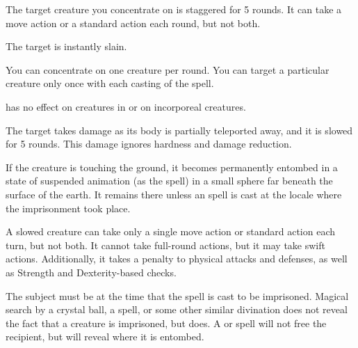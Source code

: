 \begin{spellhealthy}
    The target creature you concentrate on is staggered for 5 rounds. It can take a move action or a standard action each round, but not both.
\end{spellhealthy}
\begin{spellblood}
    The target is instantly slain.
\end{spellblood}
\begin{spellnotes}
    You can concentrate on one creature per round. You can target a particular creature only once with each casting of the spell.
    \par {} has no effect on creatures in  or on incorporeal creatures.
\end{spellnotes}

\begin{spelleffect}
    The target takes damage as its body is partially teleported away, and it is slowed for 5 rounds. This damage ignores hardness and damage reduction.
\end{spelleffect}
\begin{spellblood}
    If the creature is touching the ground, it becomes permanently entombed in a state of suspended animation (as the  spell) in a small sphere far beneath the surface of the earth. It remains there unless an  spell is cast at the locale where the imprisonment took place.
\end{spellblood}
\begin{spellnotes}
    A slowed creature can take only a single move action or standard action each turn, but not both. It cannot take full-round actions, but it may take swift actions. Additionally, it takes a  penalty to physical attacks and defenses, as well as Strength and Dexterity-based checks.

    The subject must be \bloodied at the time that the spell is cast to be imprisoned. Magical search by a crystal ball, a  spell, or some other similar divination does not reveal the fact that a creature is imprisoned, but  does. A  or  spell will not free the recipient, but will reveal where it is entombed.
\end{spellnotes}

